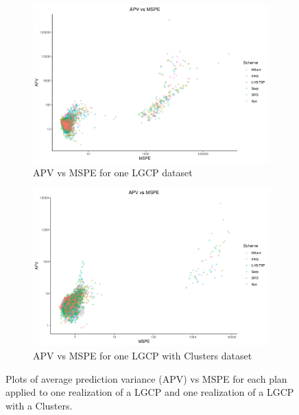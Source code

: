\documentclass[review]{elsarticle}
\begin{document}
\begin{figure}

\begin{subfigure}{5in}
\includegraphics[width=5in]{../graphics/APV-MSPE-LGCP000004.png}
\caption{APV vs MSPE for one LGCP dataset}
\label{apvlgcp}
\end{subfigure}

\begin{subfigure}{5in}
\includegraphics[width=5in]{../graphics/APV-MSPE-Cluster000004.png}
\caption{APV vs MSPE for one LGCP with Clusters dataset}
\label{apvcluster}
\end{subfigure}

\caption{Plots of average prediction variance (APV) vs MSPE for each plan
applied to one realization of a LGCP and one realization of a LGCP with a
Clusters.}
\label{apvresults}
\end{figure}
\end{document}
